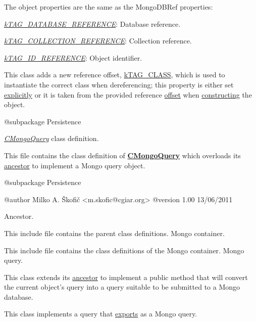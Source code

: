 The object properties are the same as the Mongo\-D\-B\-Ref properties\-:


\begin{DoxyItemize}
\item {\itshape \hyperlink{}{k\-T\-A\-G\-\_\-\-D\-A\-T\-A\-B\-A\-S\-E\-\_\-\-R\-E\-F\-E\-R\-E\-N\-C\-E}\/}\-: Database reference. 
\item {\itshape \hyperlink{}{k\-T\-A\-G\-\_\-\-C\-O\-L\-L\-E\-C\-T\-I\-O\-N\-\_\-\-R\-E\-F\-E\-R\-E\-N\-C\-E}\/}\-: Collection reference. 
\item {\itshape \hyperlink{}{k\-T\-A\-G\-\_\-\-I\-D\-\_\-\-R\-E\-F\-E\-R\-E\-N\-C\-E}\/}\-: Object identifier. 
\end{DoxyItemize}

This class adds a new reference offset, \hyperlink{}{k\-T\-A\-G\-\_\-\-C\-L\-A\-S\-S}, which is used to instantiate the correct class when dereferencing; this property is either set \hyperlink{}{explicitly} or it is taken from the provided reference \hyperlink{}{offset} when \hyperlink{}{constructing} the object.

\begin{DoxyVerb}    @subpackage     Persistence\end{DoxyVerb}


{\itshape \hyperlink{class_c_mongo_query}{C\-Mongo\-Query}\/} class definition.

This file contains the class definition of {\bfseries \hyperlink{class_c_mongo_query}{C\-Mongo\-Query}} which overloads its \hyperlink{class_c_query}{ancestor} to implement a Mongo query object.

\begin{DoxyVerb}    @subpackage     Persistence

    @author         Milko A. Škofič <m.skofic@cgiar.org>
    @version        1.00 13/06/2011\end{DoxyVerb}


Ancestor.

This include file contains the parent class definitions. Mongo container.

This include file contains the class definitions of the Mongo container. Mongo query.

This class extends its \hyperlink{class_c_query}{ancestor} to implement a public method that will convert the current object's query into a query suitable to be submitted to a Mongo database.

This class implements a query that \hyperlink{}{exports} as a Mongo query.

